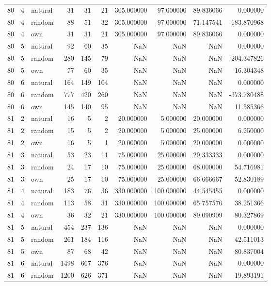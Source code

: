 \begin{table}[htbp]
\begin{tabular}{rrlrrrrrrr}
80 & 4 & natural & 31 & 31 & 21 & 305.000000 & 97.000000 & 89.836066 & 0.000000 \\
80 & 4 & random & 88 & 51 & 32 & 305.000000 & 97.000000 & 71.147541 & -183.870968 \\
80 & 4 & own & 31 & 31 & 21 & 305.000000 & 97.000000 & 89.836066 & 0.000000 \\
80 & 5 & natural & 92 & 60 & 35 & NaN & NaN & NaN & 0.000000 \\
80 & 5 & random & 280 & 145 & 79 & NaN & NaN & NaN & -204.347826 \\
80 & 5 & own & 77 & 60 & 35 & NaN & NaN & NaN & 16.304348 \\
80 & 6 & natural & 164 & 149 & 104 & NaN & NaN & NaN & 0.000000 \\
80 & 6 & random & 777 & 420 & 260 & NaN & NaN & NaN & -373.780488 \\
80 & 6 & own & 145 & 140 & 95 & NaN & NaN & NaN & 11.585366 \\
81 & 2 & natural & 16 & 5 & 2 & 20.000000 & 5.000000 & 20.000000 & 0.000000 \\
81 & 2 & random & 15 & 5 & 2 & 20.000000 & 5.000000 & 25.000000 & 6.250000 \\
81 & 2 & own & 16 & 5 & 1 & 20.000000 & 5.000000 & 20.000000 & 0.000000 \\
81 & 3 & natural & 53 & 23 & 11 & 75.000000 & 25.000000 & 29.333333 & 0.000000 \\
81 & 3 & random & 24 & 17 & 10 & 75.000000 & 25.000000 & 68.000000 & 54.716981 \\
81 & 3 & own & 25 & 17 & 10 & 75.000000 & 25.000000 & 66.666667 & 52.830189 \\
81 & 4 & natural & 183 & 76 & 36 & 330.000000 & 100.000000 & 44.545455 & 0.000000 \\
81 & 4 & random & 113 & 58 & 31 & 330.000000 & 100.000000 & 65.757576 & 38.251366 \\
81 & 4 & own & 36 & 32 & 21 & 330.000000 & 100.000000 & 89.090909 & 80.327869 \\
81 & 5 & natural & 454 & 237 & 136 & NaN & NaN & NaN & 0.000000 \\
81 & 5 & random & 261 & 184 & 116 & NaN & NaN & NaN & 42.511013 \\
81 & 5 & own & 87 & 68 & 42 & NaN & NaN & NaN & 80.837004 \\
81 & 6 & natural & 1498 & 667 & 376 & NaN & NaN & NaN & 0.000000 \\
81 & 6 & random & 1200 & 626 & 371 & NaN & NaN & NaN & 19.893191 \\

\end{tabular}
\end{table}
